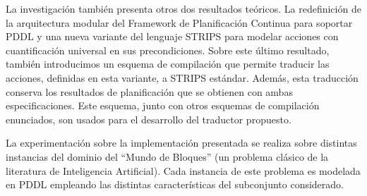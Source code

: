 La investigaci\'on tambi\'en presenta otros dos resultados te\'oricos. 
La redefinici\'on de la arquitectura modular del Framework
de Planificaci\'on Continua para soportar PDDL y 
una nueva variante del lenguaje STRIPS para modelar acciones
con cuantificaci\'on universal en sus precondiciones. 
Sobre este \'ultimo resultado, tambi\'en introducimos un esquema de
compilaci\'on que permite traducir las acciones, definidas 
en esta variante, a STRIPS est\'andar. Adem\'as, esta traducci\'on conserva los resultados de 
planificaci\'on que se obtienen con ambas especificaciones. 
Este esquema, junto con otros esquemas de compilaci\'on enunciados, 
son usados para el desarrollo del traductor propuesto.

La experimentaci\'on sobre la implementaci\'on presentada se realiza sobre distintas
instancias del dominio del ``Mundo de Bloques'' (un problema
cl\'asico de la literatura de Inteligencia Artificial). Cada instancia de
este problema es modelada en PDDL empleando las distintas
ca\-rac\-te\-r\'is\-ti\-cas del subconjunto considerado.


\vfill
\pagebreak
